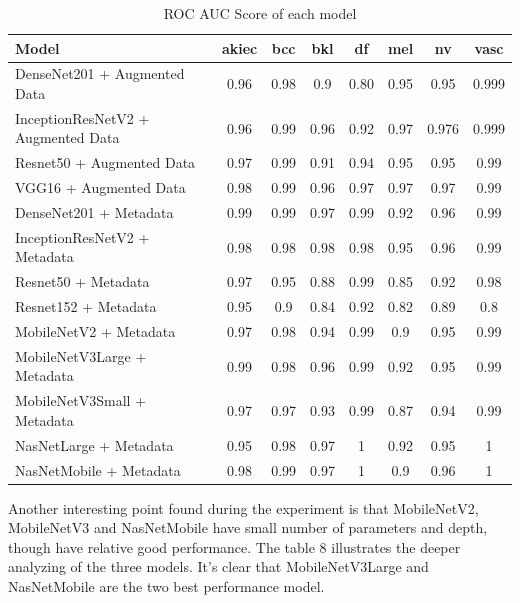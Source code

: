 \begin{table}[ht]
	\centering
	\begin{tabular}{|l | c | c | c | c | c | c | c|} 
		\hline
		Model & akiec & bcc & bkl & df & mel & nv & vasc \\
		\hline
		DenseNet201 + Augmented Data & 0.96 & 0.98 & 0.9 & 0.80 & 0.95 & 0.95 & 0.999\\ 
		\hline
		InceptionResNetV2 + Augmented Data & 0.96 & 0.99 & 0.96 & 0.92 & 0.97 & 0.976 & 0.999\\
		\hline
		Resnet50 + Augmented Data & 0.97 & 0.99 & 0.91 & 0.94 & 0.95 & 0.95 & 0.99\\
		\hline 	
		VGG16 + Augmented Data & 0.98 & 0.99 & 0.96 & 0.97 & 0.97 & 0.97 & 0.99\\ 
		\hline		
		DenseNet201 + Metadata & 0.99 & 0.99 & 0.97 & 0.99 & 0.92 & 0.96 & 0.99\\
		\hline
		InceptionResNetV2 + Metadata & 0.98 & 0.98 & 0.98 & 0.98 & 0.95 & 0.96 & 0.99\\
		\hline
		Resnet50 + Metadata & 0.97 & 0.95 & 0.88 & 0.99 & 0.85 & 0.92 & 0.98\\
		\hline
		Resnet152 + Metadata & 0.95 & 0.9 & 0.84 & 0.92 & 0.82 & 0.89 & 0.8\\
		\hline
		MobileNetV2 + Metadata & 0.97 & 0.98 & 0.94 & 0.99 & 0.9 & 0.95 & 0.99\\
		\hline
		MobileNetV3Large + Metadata & 0.99 & 0.98 & 0.96 & 0.99 & 0.92 & 0.95 & 0.99\\
		\hline
		MobileNetV3Small + Metadata & 0.97 & 0.97 & 0.93 & 0.99 & 0.87 & 0.94 & 0.99\\
		\hline
		NasNetLarge + Metadata & 0.95 & 0.98 & 0.97 & 1 & 0.92 & 0.95 & 1\\
		\hline
		NasNetMobile + Metadata & 0.98 & 0.99 & 0.97 & 1 & 0.9 & 0.96 & 1\\
		\hline
	\end{tabular}
	\caption{ROC AUC Score of each model}
	\label{table:7}
\end{table}
\FloatBarrier
Another interesting point found during the experiment is that MobileNetV2, MobileNetV3 and NasNetMobile have small number of parameters and depth, though have relative good performance. The table 8 illustrates the deeper analyzing of the three models. It's clear that MobileNetV3Large and NasNetMobile are the two best performance model.
\FloatBarrier
